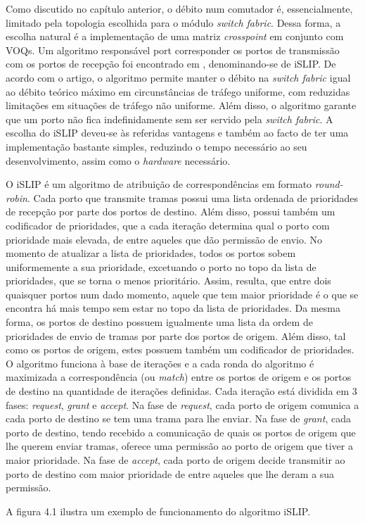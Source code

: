Como discutido no capítulo anterior, o débito num comutador é, essencialmente, limitado pela topologia escolhida para o módulo \textit{switch fabric}. Dessa forma, a escolha natural é a implementação de uma matriz \textit{crosspoint} em conjunto com VOQs. Um algoritmo responsável port corresponder os portos de transmissão com os portos de recepção foi encontrado em \cite{iSLIP}, denominando-se de iSLIP. De acordo com o  artigo, o algoritmo permite manter o débito na \textit{switch fabric} igual ao débito teórico máximo em circunstâncias de tráfego uniforme, com reduzidas limitações em situações de tráfego não uniforme. Além disso, o algoritmo garante que um porto não fica indefinidamente sem ser servido pela \textit{switch fabric}. A escolha do iSLIP deveu-se às referidas vantagens e também ao facto de ter uma implementação bastante simples, reduzindo o tempo necessário ao seu desenvolvimento, assim como o \textit{hardware} necessário.\par O iSLIP é um algoritmo de atribuição de correspondências em formato \textit{round-robin}. Cada porto que transmite tramas possui uma lista ordenada de prioridades de recepção por parte dos portos de destino. Além disso, possui também um codificador de prioridades, que a cada iteração determina qual o porto com prioridade mais elevada, de entre aqueles que dão permissão de envio. No momento de atualizar a lista de prioridades, todos os portos sobem uniformemente a sua prioridade, excetuando o porto no topo da lista de prioridades, que se torna o menos prioritário. Assim, resulta, que entre dois quaisquer portos num dado momento, aquele que tem maior prioridade é o que se encontra há mais tempo sem estar no topo da lista de prioridades. Da mesma forma, os portos de destino possuem igualmente uma lista da ordem de prioridades de envio de tramas por parte dos portos de origem. Além disso, tal como os portos de origem, estes possuem também um codificador de prioridades. O algoritmo funciona à base de iterações e a cada ronda do algoritmo é maximizada a correspondência (ou \textit{match}) entre os portos de origem e os portos de destino na quantidade de iterações definidas. Cada iteração está dividida em 3 fases: \textit{request}, \textit{grant} e \textit{accept}. Na fase de \textit{request}, cada porto de origem comunica a cada porto de destino se tem uma trama para lhe enviar. Na fase de \textit{grant}, cada porto de destino, tendo recebido a comunicação de quais os portos de origem que lhe querem enviar tramas, oferece uma permissão ao porto de origem que tiver a maior prioridade. Na fase de \textit{accept}, cada porto de origem decide transmitir ao porto de destino com maior prioridade de entre aqueles que lhe deram a sua permissão.\par A figura 4.1 ilustra um exemplo de funcionamento do algoritmo iSLIP.

